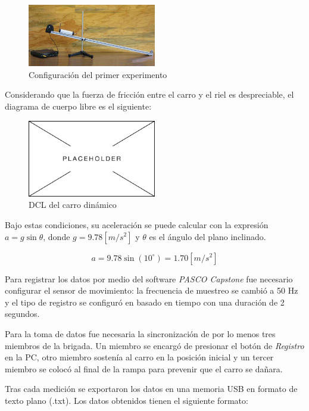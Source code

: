 \documentclass[12pt, titlepage]{report}
\begin{document}
    \begin{figure}[ht]
        \centering
        \setcounter{figure}{0}
        \includegraphics[width=0.5\textwidth]{Rampa_Exp1.png}
        \caption{Configuración del primer experimento}
    \end{figure}

    Considerando que la fuerza de fricción entre el carro y el riel es despreciable, el diagrama de cuerpo libre es el siguiente: 

    \begin{figure}[ht]
        \centering
        \includegraphics[width=0.5\textwidth]{Placeholder.png}
        \caption{DCL del carro dinámico}
    \end{figure}

    Bajo estas condiciones, su aceleración se puede calcular con la expresión $a=g\sin\theta$, donde $g=9.78[m/s^2]$ y $\theta$ es el ángulo del plano inclinado.
    
    $$a=9.78\sin(10^\circ) = 1.70[m/s^2]$$

    Para registrar los datos por medio del software \textit{PASCO Capstone} fue necesario configurar el sensor de movimiento: la frecuencia de muestreo se cambió a 50 Hz y el tipo de registro se configuró en basado en tiempo con una duración de 2 segundos. 

    Para la toma de datos fue necesaria la sincronización de por lo menos tres miembros de la brigada. Un miembro se encargó de presionar el botón de \textit{Registro} en la PC, otro miembro sostenía al carro en la posición inicial y un tercer miembro se colocó al final de la rampa para prevenir que el carro se dañara.

    Tras cada medición se exportaron los datos en una memoria USB en formato de texto plano (.txt). Los datos obtenidos tienen el siguiente formato:
\end{document}
